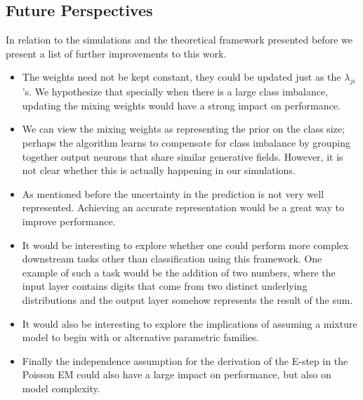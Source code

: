 \documentclass{article}
\begin{document}
\subsection{Future Perspectives}
In relation to the simulations and the theoretical framework presented before we present a list of further improvements to this work.
 
\begin{itemize}
\item
	The weights need not be kept constant, they could be updated just as the $\lambda_{ji}$'s. We hypothesize that specially when there is a large class imbalance, updating the mixing weights would have a strong impact on performance. 
\item
	We can view the mixing weights as representing the prior on the class size; perhaps the algorithm learns to compensate for class imbalance by grouping together output neurons that share similar generative fields. However, it is not clear whether this is actually happening in our simulations.
\item
	As mentioned before the uncertainty in the prediction is not very well represented. Achieving an accurate representation would be a great way to improve performance.
\item
	It would be interesting to explore whether one could perform more complex downstream tasks other than classification using this framework. One example of such a task would be the addition of two numbers, where the input layer contains digits that come from two distinct underlying distributions and the output layer somehow represents the result of the sum.
\item
	It would also be interesting to explore the implications of assuming a mixture model to begin with or alternative parametric families.
\item
	Finally the independence assumption for the derivation of the E-step in the Poisson EM could also have a large impact on performance, but also on model complexity.
\end{itemize}
 
\pagebreak
\printbibliography
\end{document}
